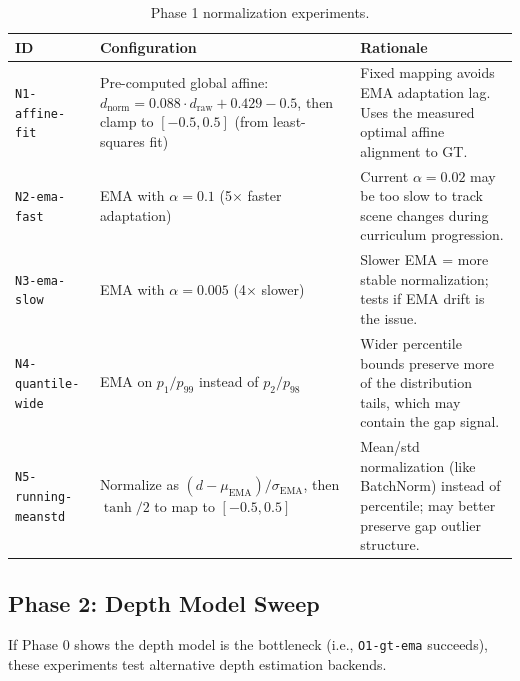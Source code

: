 \documentclass[11pt,a4paper]{article}
\begin{document}
\begin{table}[h]
\centering
\small
\begin{tabular}{p{2.5cm}p{5cm}p{5cm}}
\toprule
\textbf{ID} & \textbf{Configuration} & \textbf{Rationale} \\
\midrule
\texttt{N1-affine-fit} &
  Pre-computed global affine: $d_{\text{norm}} = 0.088 \cdot d_{\text{raw}} + 0.429 - 0.5$,
  then clamp to $[-0.5, 0.5]$ (from least-squares fit) &
  Fixed mapping avoids EMA adaptation lag.  Uses the measured optimal affine
  alignment to GT. \\
\midrule
\texttt{N2-ema-fast} &
  EMA with $\alpha = 0.1$ (5$\times$ faster adaptation) &
  Current $\alpha = 0.02$ may be too slow to track scene changes during
  curriculum progression. \\
\midrule
\texttt{N3-ema-slow} &
  EMA with $\alpha = 0.005$ (4$\times$ slower) &
  Slower EMA = more stable normalization; tests if EMA drift is the issue. \\
\midrule
\texttt{N4-quantile-wide} &
  EMA on $p_1 / p_{99}$ instead of $p_2 / p_{98}$ &
  Wider percentile bounds preserve more of the distribution tails, which
  may contain the gap signal. \\
\midrule
\texttt{N5-running-meanstd} &
  Normalize as $(d - \mu_{\text{EMA}}) / \sigma_{\text{EMA}}$, then
  $\tanh / 2$ to map to $[-0.5, 0.5]$ &
  Mean/std normalization (like BatchNorm) instead of percentile; may better
  preserve gap outlier structure. \\
\bottomrule
\end{tabular}
\caption{Phase 1 normalization experiments.}
\label{tab:phase1}
\end{table}

\subsection{Phase 2: Depth Model Sweep}

If Phase 0 shows the depth model is the bottleneck (i.e., \texttt{O1-gt-ema}
succeeds), these experiments test alternative depth estimation backends.
\end{document}
